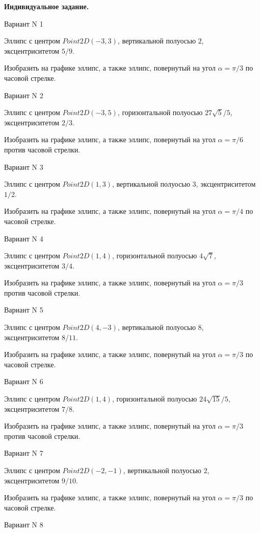 \documentclass[11pt]{report}
\begin{document}
\pagestyle{empty}

{\bf Индивидуальное задание.}

Вариант N 1

Эллипс с центром $Point2D\left(-3, 3\right)$, вертикальной полуосью $2$, эксцентриситетом $5 / 9$.

    Изобразить на графике эллипс, а также эллипс, повернутый на угол $\alpha = $$\pi / 3$ по часовой стрелке.

Вариант N 2

Эллипс с центром $Point2D\left(-3, 5\right)$, горизонтальной полуосью $27 \sqrt{5} / 5$, эксцентриситетом $2 / 3$.

    Изобразить на графике эллипс, а также эллипс, повернутый на угол $\alpha = $$\pi / 6$ против часовой стрелки.

Вариант N 3

Эллипс с центром $Point2D\left(1, 3\right)$, вертикальной полуосью $3$, эксцентриситетом $1 / 2$.

    Изобразить на графике эллипс, а также эллипс, повернутый на угол $\alpha = $$\pi / 4$ по часовой стрелке.

Вариант N 4

Эллипс с центром $Point2D\left(1, 4\right)$, горизонтальной полуосью $4 \sqrt{7}$, эксцентриситетом $3 / 4$.

    Изобразить на графике эллипс, а также эллипс, повернутый на угол $\alpha = $$\pi / 3$ против часовой стрелки.

Вариант N 5

Эллипс с центром $Point2D\left(4, -3\right)$, вертикальной полуосью $8$, эксцентриситетом $8 / 11$.

    Изобразить на графике эллипс, а также эллипс, повернутый на угол $\alpha = $$\pi / 3$ по часовой стрелке.

Вариант N 6

Эллипс с центром $Point2D\left(1, 4\right)$, горизонтальной полуосью $24 \sqrt{15} / 5$, эксцентриситетом $7 / 8$.

    Изобразить на графике эллипс, а также эллипс, повернутый на угол $\alpha = $$\pi / 3$ против часовой стрелки.

Вариант N 7

Эллипс с центром $Point2D\left(-2, -1\right)$, вертикальной полуосью $2$, эксцентриситетом $9 / 10$.

    Изобразить на графике эллипс, а также эллипс, повернутый на угол $\alpha = $$\pi / 3$ по часовой стрелке.

Вариант N 8
\end{document}
